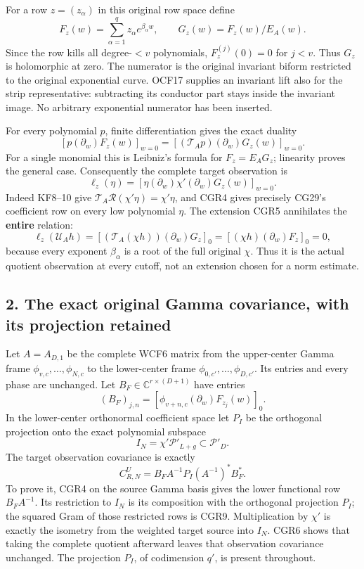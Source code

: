 \documentclass[11pt]{article}
\begin{document}
For a row \(z=(z_\alpha)\) in this original row space define \[
F_z(w)=\sum_{\alpha=1}^qz_\alpha e^{\beta_\alpha w},\qquad
G_z(w)=F_z(w)/E_A(w).
\tag{CGR3}
\] Since the row kills all degree-\(<v\) polynomials, \(F_z^{(j)}(0)=0\) for \(j<v\). Thus \(G_z\) is holomorphic at zero. The numerator is the original invariant biform restricted to the original exponential curve. OCF17 supplies an invariant lift also for the strip representative: subtracting its conductor part stays inside the invariant image. No arbitrary exponential numerator has been inserted.

For every polynomial \(p\), finite differentiation gives the exact duality \[
[p(\partial_w)F_z(w)]_{w=0}
=[(\mathcal T_Ap)(\partial_w)G_z(w)]_{w=0}.
\tag{CGR4}
\] For a single monomial this is Leibniz's formula for \(F_z=E_AG_z\); linearity proves the general case. Consequently the complete target observation is \[
\ell_z(\eta)=
[\eta(\partial_w)\chi'(\partial_w)G_z(w)]_{w=0}.
\tag{CGR5}
\] Indeed KF8--10 give \(\mathcal T_A\mathcal R(\chi'\eta)=\chi'\eta\), and CGR4 gives precisely CG29's coefficient row on every low polynomial \(\eta\). The extension CGR5 annihilates the \textbf{entire} relation: \[
\ell_z(\mathcal U_Ah)
=[(\mathcal T_A(\chi h))(\partial_w)G_z]_{0}
=[(\chi h)(\partial_w)F_z]_{0}=0,
\tag{CGR6}
\] because every exponent \(\beta_\alpha\) is a root of the full original \(\chi\). Thus it is the actual quotient observation at every cutoff, not an extension chosen for a norm estimate.

\subsection{2. The exact original Gamma covariance, with its projection retained}\label{the-exact-original-gamma-covariance-with-its-projection-retained}

Let \(A=A_{D,1}\) be the complete WCF6 matrix from the upper-center Gamma frame \(\phi_{v,c},\ldots,\phi_{N,c}\) to the lower-center frame \(\phi_{0,c'},\ldots,\phi_{D,c'}\). Its entries and every phase are unchanged. Let \(B_F\in\mathbb C^{r\times(D+1)}\) have entries \[
(B_F)_{j,n}=[\phi_{v+n,c}(\partial_w)F_{z_j}(w)]_{0}.
\tag{CGR7}
\] In the lower-center orthonormal coefficient space let \(P_I\) be the orthogonal projection onto the exact polynomial subspace \[
I_N=\chi'\mathcal P'_{L+g}\subset\mathcal P'_D.
\tag{CGR8}
\] The target observation covariance is exactly \[
\boxed{C_{R,N}^U=B_FA^{-1}P_I(A^{-1})^*B_F^*.}
\tag{CGR9}
\] To prove it, CGR4 on the source Gamma basis gives the lower functional row \(B_FA^{-1}\). Its restriction to \(I_N\) is its composition with the orthogonal projection \(P_I\); the squared Gram of those restricted rows is CGR9. Multiplication by \(\chi'\) is exactly the isometry from the weighted target source into \(I_N\). CGR6 shows that taking the complete quotient afterward leaves that observation covariance unchanged. The projection \(P_I\), of codimension \(q'\), is present throughout.
\end{document}
